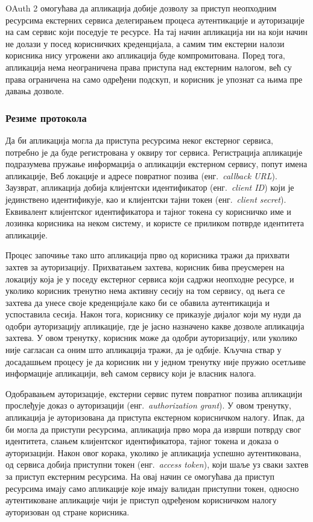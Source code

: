 \documentclass[12pt,oneside]{memoir}
\begin{document}
OAuth 2 омогућава да апликација добије дозволу за приступ неопходним ресурсима екстерних сервиса делегирањем процеса аутентикације и ауторизације на сам сервис који поседује те ресурсе. На тај начин апликација ни на који начин не долази у посед корисничких креденцијала, а самим тим екстерни налози корисника нису угрожени ако апликација буде компромитована. Поред тога, апликација нема неограничена права приступа над екстерним налогом, већ су права ограничена на само одређени подскуп, и корисник је упознат са њима пре давања дозволе.

\subsubsection{Резиме протокола}
Да би апликација могла да приступа ресурсима неког екстерног сервиса, потребно је да буде регистрована у оквиру тог сервиса. Регистрација апликације подразумева пружање информација о апликацији екстерном сервису, попут имена апликације, Веб локације и адресе повратног позива (енг.~\textit{callback URL}). Заузврат, апликација добија клијентски идентификатор (енг.~\textit{client ID}) који је јединствено идентификује, као и клијентски тајни токен (енг.~\textit{client secret}). Еквивалент клијентског идентификатора и тајног токена су корисничко име и лозинка корисника на неком систему, и користе се приликом потврде идентитета апликације.

Процес започиње тако што апликација прво од корисника тражи да прихвати захтев за ауторизацију. Прихватањем захтева, корисник бива преусмерен на локацију која је у поседу екстерног сервиса који садржи неопходне ресурсе, и уколико корисник тренутно нема активну сесију на том сервису, од њега се захтева да унесе своје креденцијале како би се обавила аутентикација и успоставила сесија. Након тога, кориснику се приказује дијалог који му нуди да одобри ауторизацију апликације, где је јасно назначено какве дозволе апликација захтева. У овом тренутку, корисник може да одобри ауторизацију, или уколико није сагласан са оним што апликација тражи, да је одбије. Кључна ствар у досадашњем процесу је да корисник ни у једном тренутку није пружио осетљиве информације апликацији, већ самом сервису који је власник налога.

Одобравањем ауторизације, екстерни сервис путем повратног позива апликацији прослеђује доказ о ауторизацији (енг.~\textit{authorization grant}). У овом тренутку, апликација је ауторизована да приступа екстерном корисничком налогу. Ипак, да би могла да приступи ресурсима, апликација прво мора да изврши потврду свог идентитета, слањем клијентског идентификатора, тајног токена и доказа о ауторизацији. Након овог корака, уколико је апликација успешно аутентикована, од сервиса добија приступни токен (енг.~\textit{access token}), који шаље уз сваки захтев за приступ екстерним ресурсима. На овај начин се омогућава да приступ ресурсима имају само апликације које имају валидан приступни токен, односно аутентиковане апликације чији је приступ одређеном корисничком налогу ауторизован од стране корисника.
\end{document}

